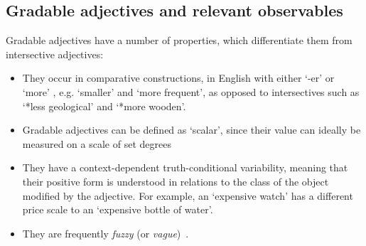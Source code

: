 \documentclass[11pt]{article}
\begin{document}
\subsection{Gradable adjectives and relevant observables} \label{sec:gradables}

Gradable adjectives have a number of properties, which differentiate them
from intersective adjectives:

\begin{itemize}[noitemsep]
\item They occur in comparative constructions, in English with either `-er' or `more' \cite{kennedy1999scalar}, e.g. `smaller' and `more frequent', as opposed to intersectives such as `*less geological' and `*more wooden'.
\item Gradable adjectives can be defined as `scalar', since their value can ideally be measured on a scale of set degrees
\item They have a context-dependent truth-conditional variability, meaning that their positive form
    is understood in relations to the class of the object modified by the adjective. For example, an
    `expensive watch' has a different price scale to an `expensive bottle of water'.
\item They are frequently \emph{fuzzy} (or \emph{vague})~\cite{kennedy2007vagueness}.


\end{itemize}
\end{document}
